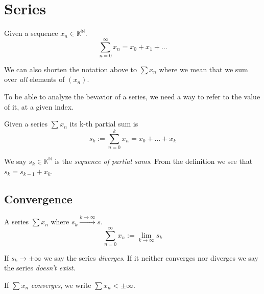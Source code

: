 \section{Series}
\begin{definition}[Series]
   Given a sequence \(x_n \in \mathbb{K}^\mathbb{N}\).
   \[\sum_{n=0}^{\infty} x_n = x_0 + x_1 + \ldots\]
\end{definition}
\begin{remark}[Notation]
   We can also shorten the notation above to \(\sum x_n\) where we mean that we sum over \emph{all} elements of \((x_n)\).
\end{remark}
To be able to analyze the bevavior of a series, we need a way to refer to the value of it, at a given index.
\begin{definition}
   Given a series \(\sum x_n\) its k-th partial sum is
   \[s_k := \sum_{n = 0}^{k} x_n = x_0 + \ldots + x_k\]
\end{definition}
\begin{remark}[Terminology]
   We say \(s_k \in \mathbb{K}^\mathbb{N}\) is the \emph{sequence of partial sums}.
   From the definition we see that \(s_k =  s_{k-1} + x_k\).
\end{remark}

\subsection{Convergence}
\begin{definition}\label{def:series_convergence}
   A series \(\sum x_n\) where \(s_k \xrightarrow{k \to \infty} s\).
   \[\sum_{n=0}^{\infty} x_n := \lim_{k \to \infty} s_k\]
\end{definition}
\begin{remark}[Terminology]
   If \(s_k \to \pm\infty\) we say the series \emph{diverges}.
   If it neither converges nor diverges we say the series \emph{doesn't exist}.
\end{remark}
\begin{remark}[Notation]
   If \(\sum x_n\) \emph{converges}, we write \(\sum x_n < \pm\infty\).
\end{remark}

